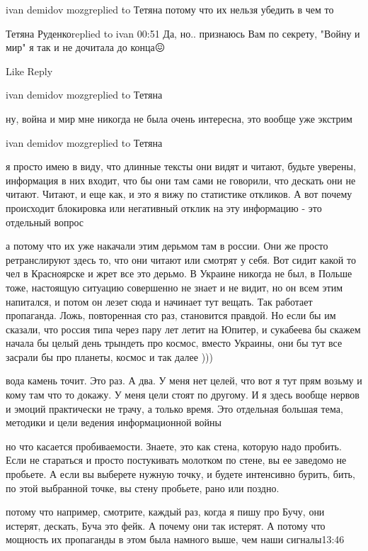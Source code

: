 ivan demidov mozgreplied to Тетяна
потому что их нельзя убедить в чем то

Тетяна Руденкоreplied to ivan
00:51
Да, но.. признаюсь Вам по секрету, "Войну и мир" я так и не дочитала до конца😖

    Like
    Reply

ivan demidov mozgreplied to Тетяна

ну, война и мир мне никогда не была очень интересна, это вообще уже экстрим

ivan demidov mozgreplied to Тетяна

я просто имею в виду, что длинные тексты они видят и читают, будьте уверены,
информация в них входит, что бы они там сами не говорили, что дескать они не
читают. Читают, и еще как, и это я вижу по статистике откликов. А вот почему
происходит блокировка или негативный отклик на эту информацию - это отдельный
вопрос

а потому что их уже накачали этим дерьмом там в россии. Они же просто
ретранслируют здесь то, что они читают или смотрят у себя. Вот сидит какой то
чел в Красноярске и жрет все это дерьмо. В Украине никогда не был, в Польше
тоже, настоящую ситуацию совершенно не знает и не видит, но он всем этим
напитался, и потом он лезет сюда и начинает тут вещать. Так работает
пропаганда. Ложь, повторенная сто раз, становится правдой. Но если бы им
сказали, что россия типа через пару лет летит на Юпитер, и сукабеева бы скажем
начала бы целый день трындеть про космос, вместо Украины, они бы тут все
засрали бы про планеты, космос и так далее )))

вода камень точит. Это раз. А два. У меня нет целей, что вот я тут прям возьму
и кому там что то докажу. У меня цели стоят по другому. И я здесь вообще нервов
и эмоций практически не трачу, а только время. Это отдельная большая тема,
методики и цели ведения информационной войны

но что касается пробиваемости. Знаете, это как стена, которую надо пробить.
Если не стараться и просто постукивать молотком по стене, вы ее заведомо не
пробьете. А если вы выберете нужную точку, и будете интенсивно бурить, бить, по
этой выбранной точке, вы стену пробьете, рано или поздно.

потому что например, смотрите, каждый раз, когда я пишу про Бучу, они истерят,
дескать, Буча это фейк. А почему они так истерят. А потому что мощность их
пропаганды в этом была намного выше, чем наши сигналы13:46

